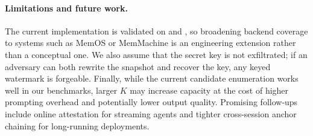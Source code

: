 \paragraph{Limitations and future work.}
The current implementation is validated on \amem{} and \graphiti{}, so
broadening backend coverage to systems such as MemOS or MemMachine is an
engineering extension rather than a conceptual one. We also assume that
the secret key is not exfiltrated; if an adversary can both rewrite the
snapshot and recover the key, any keyed watermark is forgeable.
Finally, while the current candidate enumeration works well in our
benchmarks, larger \(K\) may increase capacity at the cost of higher
prompting overhead and potentially lower output quality. Promising
follow-ups include online attestation for streaming agents and
tighter cross-session anchor chaining for long-running deployments.
